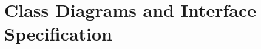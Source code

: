 \documentclass[letterpaper,english, 12pt]{scrreprt}
\begin{document}

\chapter{Class Diagrams and Interface Specification}
\end{document}
